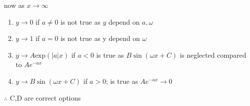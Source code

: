 \documentclass[journal,12pt,twocolumn]{IEEEtran}
\theoremstyle{remark}
\begin{document}
 now as $x\to \infty$
 \begin{enumerate}
     \item $y \to 0$ if $a \neq 0$ is not true as $y$ depend on $a,\omega$
     \item $y \to 1 $ if $ a=0$ is not true as y depend on $\omega$
     \item $y \to A\text{exp}(|a|x)$ if $a < 0$ is true as $ B\sin(\omega x+C)$ is neglected compared to $A e^{-ax}$
     \item $y \to B \sin(\omega x+C)$ if $a>0$; is true as $A e^{-ax} \to 0$ 
     
 \end{enumerate}
  $\therefore$ C,D are correct options
 
\end{document}

